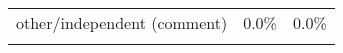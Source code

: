 \begin{tabular}{p{3.5cm} p{3cm} p{3cm}}
other/independent (comment) & 0.0\% \newline \cite{} \cellcolor[cmyk]{0.0,0.0,0.0,0.0} & 0.0\% \newline \cite{} \cellcolor[cmyk]{0.0,0.0,0.0,0.0} \\ 
 
\noalign{\smallskip}
\bottomrule
\end{tabular}
